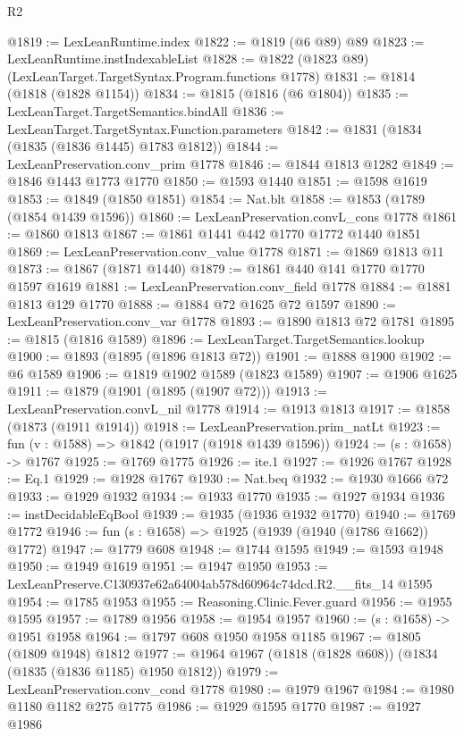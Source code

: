 \begin{lexlean}{R2}
\begin{coremodule}
@1819 := LexLeanRuntime.index
@1822 := @1819 (@6 @89) @89
@1823 := LexLeanRuntime.instIndexableList
@1828 := @1822 (@1823 @89) (LexLeanTarget.TargetSyntax.Program.functions @1778)
@1831 := @1814 (@1818 (@1828 @1154))
@1834 := @1815 (@1816 (@6 @1804))
@1835 := LexLeanTarget.TargetSemantics.bindAll
@1836 := LexLeanTarget.TargetSyntax.Function.parameters
@1842 := @1831 (@1834 (@1835 (@1836 @1445) @1783 @1812))
@1844 := LexLeanPreservation.conv_prim @1778
@1846 := @1844 @1813 @1282
@1849 := @1846 @1443 @1773 @1770
@1850 := @1593 @1440
@1851 := @1598 @1619
@1853 := @1849 (@1850 @1851)
@1854 := Nat.blt
@1858 := @1853 (@1789 (@1854 @1439 @1596))
@1860 := LexLeanPreservation.convL_cons @1778
@1861 := @1860 @1813
@1867 := @1861 @1441 @442 @1770 @1772 @1440 @1851
@1869 := LexLeanPreservation.conv_value @1778
@1871 := @1869 @1813 @11
@1873 := @1867 (@1871 @1440)
@1879 := @1861 @440 @141 @1770 @1770 @1597 @1619
@1881 := LexLeanPreservation.conv_field @1778
@1884 := @1881 @1813 @129 @1770
@1888 := @1884 @72 @1625 @72 @1597
@1890 := LexLeanPreservation.conv_var @1778
@1893 := @1890 @1813 @72 @1781
@1895 := @1815 (@1816 @1589)
@1896 := LexLeanTarget.TargetSemantics.lookup
@1900 := @1893 (@1895 (@1896 @1813 @72))
@1901 := @1888 @1900
@1902 := @6 @1589
@1906 := @1819 @1902 @1589 (@1823 @1589)
@1907 := @1906 @1625
@1911 := @1879 (@1901 (@1895 (@1907 @72)))
@1913 := LexLeanPreservation.convL_nil @1778
@1914 := @1913 @1813
@1917 := @1858 (@1873 (@1911 @1914))
@1918 := LexLeanPreservation.prim_natLt
@1923 := fun (v : @1588) => @1842 (@1917 (@1918 @1439 @1596))
@1924 := (s : @1658) -> @1767
@1925 := @1769 @1775
@1926 := ite.{1}
@1927 := @1926 @1767
@1928 := Eq.{1}
@1929 := @1928 @1767
@1930 := Nat.beq
@1932 := @1930 @1666 @72
@1933 := @1929 @1932
@1934 := @1933 @1770
@1935 := @1927 @1934
@1936 := instDecidableEqBool
@1939 := @1935 (@1936 @1932 @1770)
@1940 := @1769 @1772
@1946 := fun (s : @1658) => @1925 (@1939 (@1940 (@1786 @1662)) @1772)
@1947 := @1779 @608
@1948 := @1744 @1595
@1949 := @1593 @1948
@1950 := @1949 @1619
@1951 := @1947 @1950
@1953 := LexLeanPreserve.C130937e62a64004ab578d60964c74dcd.R2.__fits_14 @1595
@1954 := @1785 @1953
@1955 := Reasoning.Clinic.Fever.guard
@1956 := @1955 @1595
@1957 := @1789 @1956
@1958 := @1954 @1957
@1960 := (s : @1658) -> @1951 @1958
@1964 := @1797 @608 @1950 @1958 @1185
@1967 := @1805 (@1809 @1948) @1812
@1977 := @1964 @1967 (@1818 (@1828 @608)) (@1834 (@1835 (@1836 @1185) @1950 @1812))
@1979 := LexLeanPreservation.conv_cond @1778
@1980 := @1979 @1967
@1984 := @1980 @1180 @1182 @275 @1775
@1986 := @1929 @1595 @1770
@1987 := @1927 @1986

\end{coremodule}
\end{lexlean}

